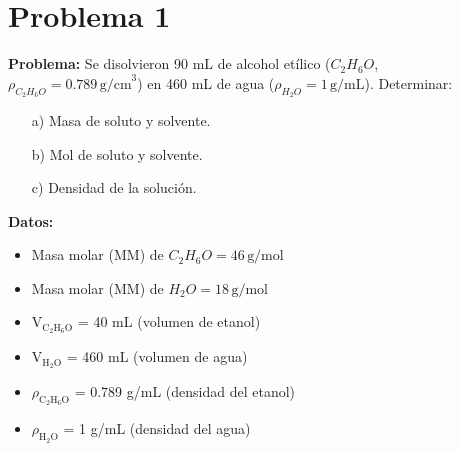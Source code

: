 \documentclass{article}
\begin{document}
\newpage
\section*{Problema 1}









\textbf{Problema:}  
Se disolvieron 90 mL de alcohol etílico (\(C_2H_6O\), \(\rho_{C_2H_6O} = 0.789 \, \text{g/cm}^3\)) en 460 mL de agua (\(\rho_{H_2O} = 1 \, \text{g/mL}\)). Determinar:

\begin{itemize}
    \item[a)] Masa de soluto y solvente.
    \item[b)] Mol de soluto y solvente.
    \item[c)] Densidad de la solución.
\end{itemize}



\noindent\textbf{Datos:} %
\begin{itemize}
    \item Masa molar (MM) de \(C_2H_6O = 46 \, \text{g/mol}\)
    \item Masa molar (MM) de \(H_2O = 18 \, \text{g/mol}\)
\end{itemize}

\textbf{} %
\begin{itemize}
\item V$_{\text{C}_2\text{H}_6\text{O}}$ = 40 mL (volumen de etanol)
\item V$_{\text{H}_2\text{O}}$ = 460 mL (volumen de agua)
\item $\rho_{\text{C}_2\text{H}_6\text{O}}$ = 0.789 g/mL (densidad del etanol)
\item $\rho_{\text{H}_2\text{O}}$ = 1 g/mL (densidad del agua)
\end{itemize}
\end{document}
